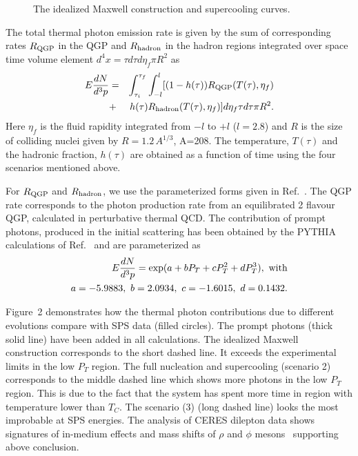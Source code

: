 \begin{figure}[t]
\centerline{}
\caption{The idealized Maxwell construction and supercooling curves.}
\end{figure}


  The total thermal photon emission rate is given by the sum of 
corresponding rates $R_{\rm QGP}$ in the QGP and $R_{\rm hadron}$ 
in the hadron regions integrated over space time volume 
element $d^4x = \tau d\tau d\eta_f \pi R^2$ as
\begin{eqnarray}\label{}
 E \frac{dN}{d^3 p}  &=& \int_{\tau_i}^{\tau_f} \int_{-l}^{l} 
     [(1-h(\tau)) R_{\rm QGP}(T(\tau),\eta_f) \nonumber \\
  &+& h(\tau)  R_{\rm hadron}(T(\tau),\eta_f) ]d\eta_f \tau d\tau \pi R^2.
\end{eqnarray}
Here $\eta_f$ is the fluid rapidity integrated from 
$-l$ to $+l$ ($l=2.8$) and $R$ is the size of colliding 
nuclei given by $R=1.2\, A^{1/3}$, A=208. 
 The temperature, $T(\tau)$ and the hadronic fraction, $h(\tau)$ are
obtained as a function of time using the four scenarios mentioned above. 

  For $R_{\rm QGP}$ and $R_{\rm hadron}$, we use the parameterized forms
given in Ref.~\cite{THOMA}. The QGP rate corresponds to 
the photon production rate from an equilibrated 2 flavour
QGP, calculated in perturbative thermal QCD.
  The contribution of prompt photons, produced in the initial 
scattering has been obtained by the PYTHIA
calculations of Ref.~\cite{GALLMEISTER} and are parameterized as
\begin{eqnarray}\label{promp}
E \frac{dN}{d^3 p} = \exp(a + bP_T + cP_T^2 + dP_T^3), \,\, {\rm with} \nonumber\\
  a=-5.9883,\,\, b=2.0934,\,\, c=-1.6015,\,\, d=0.1432.
\end{eqnarray}



   Figure~2 demonstrates how the thermal photon contributions due to 
different evolutions compare with SPS data (filled circles). The prompt 
photons (thick solid line) have been added in all calculations.
 The idealized Maxwell construction corresponds to the short dashed line.
It exceeds the experimental limits in the low $P_T$ region.
The full nucleation and supercooling (scenario 2) corresponds to 
the middle dashed line which shows more photons in the low 
$P_T$ region. This is due to the fact that the system has spent more
time in region with temperature lower than $T_C$. 
  The scenario (3) (long dashed line) looks the most improbable at SPS 
energies. The analysis of CERES dilepton data shows signatures of 
in-medium effects and mass shifts of $\rho$ and $\phi$ mesons~\cite{RAPP} 
supporting above conclusion. 

